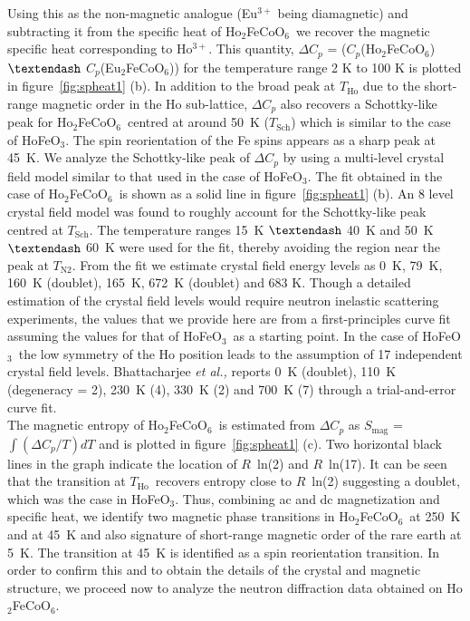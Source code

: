 \documentclass[12pt,twocolumns]{iopart}
\newcommand{\HFCO}{Ho$_2$FeCoO$_6$}
\newcommand{\HFO}{HoFeO$_{3}$}
\newcommand{\THo}{$T_\mathrm{Ho}$}
\begin{document}
Using this as the non-magnetic analogue (Eu$^{3+}$ being diamagnetic) and subtracting it
from the specific heat of \HFCO\, we recover the magnetic
specific heat corresponding to Ho$^{3+}$.
This quantity, $\Delta C_p$ = ($C_p$(Ho$_2$FeCoO$_6$) $\textendash$ $C_p$(Eu$_2$FeCoO$_6$))
for the temperature range 2 K to 100 K is plotted in figure~\ref{fig:spheat1} (b).
In addition to the broad peak at $T_\mathrm{Ho}$
due to the short-range magnetic order in the Ho sub-lattice,
$\Delta C_p$ also recovers a Schottky-like peak for \HFCO\
centred at around 50~K ($T_\mathrm{Sch}$) which is
similar to the case of \HFO \cite{bhattacharjee2002heat}.
The spin reorientation of the Fe spins appears as a sharp peak at 45~K.
%
We analyze the Schottky-like peak of $\Delta C_p$ by using a
multi-level crystal field model similar to that used in the case of
\HFO \cite{bhattacharjee2002heat}.
The fit obtained in the case of \HFCO\ is shown
as a solid line in figure~\ref{fig:spheat1} (b).
An 8 level crystal field model was found to roughly account for the Schottky-like peak
centred at $T_\mathrm{Sch}$.
The temperature ranges 15~K $\textendash$ 40~K and
50~K $\textendash$ 60~K were used for the fit, thereby avoiding the region near the peak
at $T_\mathrm{N2}$. From the fit we estimate crystal field energy levels
as 0~K, 79~K, 160~K (doublet), 165~K, 672~K (doublet) and 683 K.
Though a detailed estimation of the crystal field levels would require
neutron inelastic scattering experiments,
the values that we provide here are from a first-principles
curve fit assuming the values for that of \HFO\ as a starting point.
In the case of \HFO\, the low symmetry of the Ho position
leads to the assumption of 17 independent crystal field levels.
Bhattacharjee {\em et al.,} \cite{banerjee1964generalised} 
reports 0~K (doublet),  110~K (degeneracy = 2),
230~K (4), 330~K (2) and 700~K (7) through a trial-and-error
curve fit.
\\
The magnetic entropy of \HFCO\ is estimated from $\Delta C_p$
as $S_\mathrm{mag}$ = $\int (\Delta C_p/T)dT$ and is plotted
in figure~\ref{fig:spheat1} (c).
Two horizontal black lines in the graph indicate the location
of $R$~ln(2) and $R$~ln(17).
It can be seen that the transition at \THo\ recovers
entropy close to $R$~ln(2) suggesting a doublet, which
was the case in \HFO \cite{bhattacharjee2002heat}.
Thus, combining ac and dc magnetization and specific heat,
we identify two magnetic phase transitions in \HFCO\
at 250~K and at 45~K and also signature of short-range magnetic
order of the rare earth at 5~K.
The transition at 45~K is identified as a spin reorientation
transition. In order to confirm this and to obtain the details of the
crystal and magnetic structure, we proceed now to analyze the
neutron diffraction data obtained on \HFCO.
\end{document}
